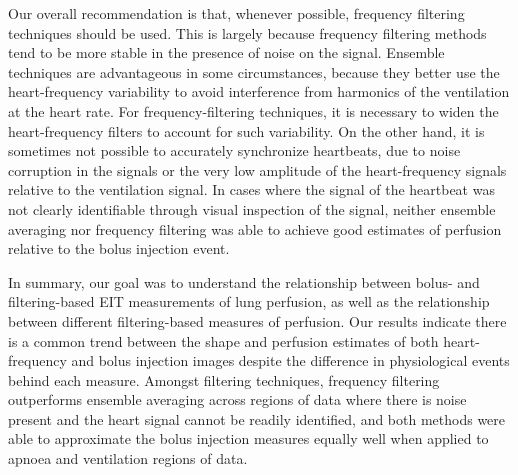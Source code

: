 Our overall recommendation is that, whenever possible, 
frequency filtering techniques should be used. This is largely
because frequency filtering methods tend to be more stable in the 
presence of noise on the signal. 
Ensemble techniques are advantageous
in some circumstances, because they better use the heart-frequency
variability to avoid interference from harmonics of the
ventilation at the heart rate. For frequency-filtering
techniques, it is necessary to widen the heart-frequency
filters to account for such variability.
On the other hand, it is sometimes not possible to accurately
synchronize heartbeats, due to noise corruption in the
signals or the very low amplitude of the heart-frequency signals
relative to the ventilation signal.
In cases where the signal of the heartbeat 
was not clearly identifiable through visual inspection of the signal, neither 
ensemble averaging nor frequency filtering was able to achieve good 
estimates of perfusion relative to the bolus injection event. 

In summary, 
our goal was to understand the relationship between bolus- and filtering-based
EIT measurements of lung perfusion, as well as the relationship between different
filtering-based measures of perfusion.
Our results indicate there is a common trend between the shape and perfusion  
estimates of both heart-frequency and bolus injection images 
despite the difference in physiological events behind each measure.
Amongst filtering techniques, frequency
filtering outperforms ensemble averaging across regions of data where there is noise present and the 
heart signal cannot be readily identified, and both methods were able to approximate the bolus injection 
measures equally well when applied to apnoea and ventilation regions of data.

